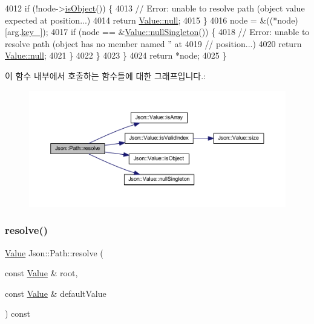 \begin{DoxyCode}
4012       \textcolor{keywordflow}{if} (!node->\hyperlink{class_json_1_1_value_a8cf96c0f2a552051fcfc78ffee60e037}{isObject}()) \{
4013         \textcolor{comment}{// Error: unable to resolve path (object value expected at position...)}
4014         \textcolor{keywordflow}{return} \hyperlink{class_json_1_1_value_a21ddb05b92c60c7548e928bf371e7d45}{Value::null};
4015       \}
4016       node = &((*node)[arg.\hyperlink{class_json_1_1_path_argument_af4024368548ff730ef2bed97d6f1ca43}{key\_}]);
4017       \textcolor{keywordflow}{if} (node == &\hyperlink{class_json_1_1_value_af2f124567acc35d021a424e53ebdfcab}{Value::nullSingleton}()) \{
4018         \textcolor{comment}{// Error: unable to resolve path (object has no member named '' at}
4019         \textcolor{comment}{// position...)}
4020         \textcolor{keywordflow}{return} \hyperlink{class_json_1_1_value_a21ddb05b92c60c7548e928bf371e7d45}{Value::null};
4021       \}
4022     \}
4023   \}
4024   \textcolor{keywordflow}{return} *node;
4025 \}
\end{DoxyCode}
이 함수 내부에서 호출하는 함수들에 대한 그래프입니다.\+:
\nopagebreak
\begin{figure}[H]
\begin{center}
\leavevmode
\includegraphics[width=350pt]{class_json_1_1_path_ad1abdc54d2e03fc0e9436c3b9fd55a33_cgraph}
\end{center}
\end{figure}
\mbox{\label{class_json_1_1_path_ab65ab001ccdbc6f8b5f123da58b92539}} 
\subsubsection{\texorpdfstring{resolve()}{resolve()}\hspace{0.1cm}{\footnotesize\ttfamily [2/2]}}
{\footnotesize\ttfamily \hyperlink{class_json_1_1_value}{Value} Json\+::\+Path\+::resolve (\begin{DoxyParamCaption}\item[{const \hyperlink{class_json_1_1_value}{Value} \&}]{root,  }\item[{const \hyperlink{class_json_1_1_value}{Value} \&}]{default\+Value }\end{DoxyParamCaption}) const}



